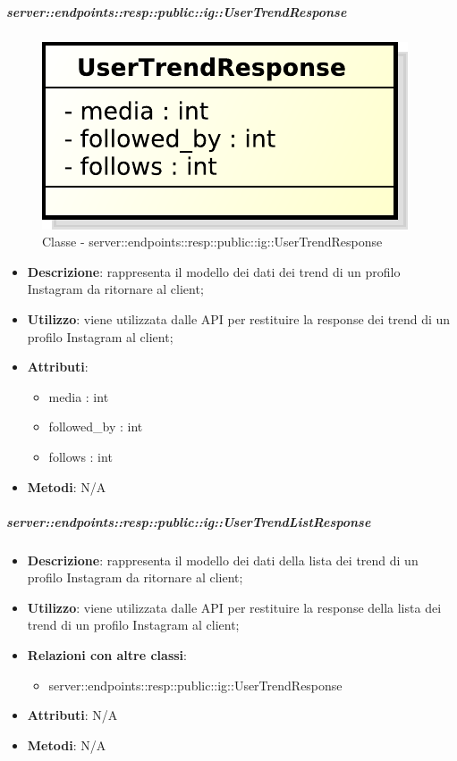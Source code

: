     \subparagraph{server::endpoints::resp::public::ig::UserTrendResponse} %
    \label{subp:bdsm_app_server_endpoints_resp_public_ig_usertrendresponse}
	\begin{figure}[!htbp]
		\centering
		\centerline{\includegraphics[scale=0.6]{./images/server/classes/endpoints/ig/user_trend_response.pdf}}
		\caption{Classe - server::endpoints::resp::public::ig::UserTrendResponse}
	\end{figure}
    \begin{itemize}
      \item \textbf{Descrizione}: rappresenta il modello dei dati dei trend di un profilo Instagram da ritornare al client;
      \item \textbf{Utilizzo}: viene utilizzata dalle API per restituire la response dei trend di un profilo Instagram al client;

	  \item \textbf{Attributi}:
	  	\begin{itemize}
	  		\item media : int
	  		\item followed\_by : int
	  		\item follows : int
	  	\end{itemize}
	  \item \textbf{Metodi}: N/A
      \end{itemize}

    \subparagraph{server::endpoints::resp::public::ig::UserTrendListResponse} %
    \label{subp:bdsm_app_server_endpoints_resp_public_ig_usertrendlistresponse}
    \begin{itemize}
      \item \textbf{Descrizione}: rappresenta il modello dei dati della lista dei trend di un profilo Instagram da ritornare al client;
      \item \textbf{Utilizzo}: viene utilizzata dalle API per restituire la response della lista dei trend di un profilo Instagram al client;
      \item \textbf{Relazioni con altre classi}:
        \begin{itemize}
          \item server::endpoints::resp::public::ig::UserTrendResponse
        \end{itemize}
	  \item \textbf{Attributi}: N/A
	  \item \textbf{Metodi}: N/A
      \end{itemize}

